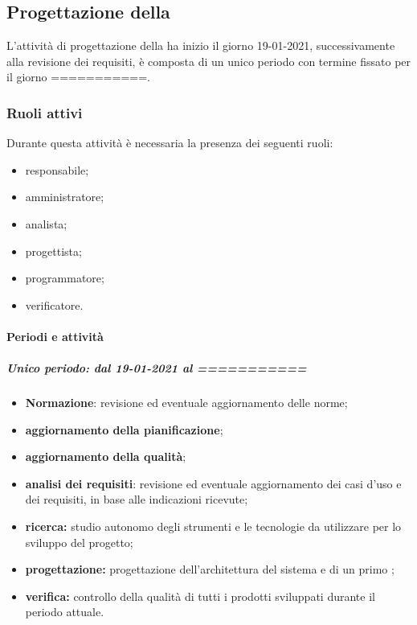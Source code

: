 \newpage %

\subsection{Progettazione della } 
L'attività di progettazione della  ha inizio il giorno 19-01-2021, successivamente alla revisione dei requisiti, è composta di un unico periodo con termine fissato per il giorno ===========.

\subsubsection{Ruoli attivi} 
Durante questa attività è necessaria la presenza dei seguenti ruoli: 
\begin{itemize} 
	\item responsabile; 
	\item amministratore; 
	\item analista; 
	\item progettista; 
	\item programmatore; 
	\item verificatore.
\end{itemize} 

\paragraph{Periodi e attività}
\subparagraph{Unico periodo: dal 19-01-2021 al ===========}
\begin{itemize}
	\item \textbf{Normazione}: revisione ed eventuale aggiornamento delle norme; 
	\item \textbf{aggiornamento della pianificazione}; 
	\item \textbf{aggiornamento della qualità}; 
	\item \textbf{analisi dei requisiti}: revisione ed eventuale aggiornamento dei casi d’uso e dei requisiti, in base alle indicazioni ricevute;
	\item \textbf{ricerca:} studio autonomo degli strumenti e le tecnologie da utilizzare per lo sviluppo del progetto;
	\item \textbf{progettazione:} progettazione dell'architettura del sistema e di un primo ;
	\item \textbf{verifica:} controllo della qualità di tutti i prodotti sviluppati durante il periodo attuale.
\end{itemize}

